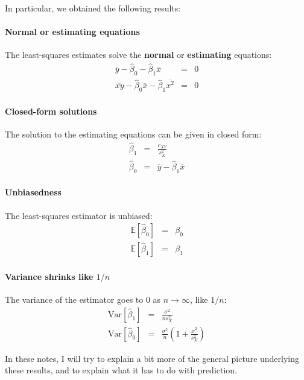 \documentclass{article}
\newcommand{\Expect}[1]{\mathbb{E}\left[ #1 \right]}
\newcommand{\Var}[1]{\mathrm{Var}\left[ #1 \right]}
\begin{document}
In particular, we obtained the following results:

\paragraph{Normal or estimating equations} The least-squares estimates solve the {\bf normal} or {\bf estimating} equations:
\begin{eqnarray}
\label{eqn:estimating-eqn-for-beta.0} \overline{y} - \hat{\beta}_0 - \hat{\beta}_1 \overline{x} & = & 0\\
\label{eqn:estimating-eqn-for-beta.1} \overline{xy} - \hat{\beta}_0 \overline{x} - \hat{\beta}_1 \overline{x^2} & = & 0
\end{eqnarray}

\paragraph{Closed-form solutions} The solution to the estimating equations can
be given in closed form:
\begin{eqnarray}
\label{eqn:closed-form-beta1-hat} \hat{\beta}_1 & = & \frac{c_{XY}}{s^2_X}\\
\label{eqn:closed-form-beta0-hat} \hat{\beta}_0 & = & \overline{y} - \hat{\beta}_1 \overline{x}
\end{eqnarray}

\paragraph{Unbiasedness} The least-squares estimator is unbiased:
\begin{eqnarray}
\label{eqn:bias-of-beta0} \Expect{\hat{\beta}_0} & = & \beta_0 \\
\Expect{\hat{\beta}_1} & = & \beta_1
\end{eqnarray}

\paragraph{Variance shrinks like $1/n$} The variance of the estimator goes to $0$ as $n\rightarrow \infty$, like $1/n$:
\begin{eqnarray}
\Var{\hat{\beta}_1} & = & \frac{\sigma^2}{n s^2_X}\\
\label{eqn:var-of-beta0} \Var{\hat{\beta}_0} & = & \frac{\sigma^2}{n}\left(1 + \frac{\overline{x}^2}{s^2_X}\right)
\end{eqnarray}

In these notes, I will try to explain a bit more of the general picture
underlying these results, and to explain what it has to do with prediction.
\end{document}
